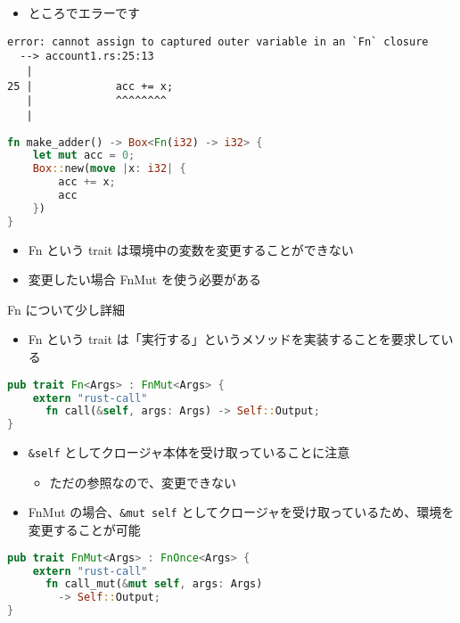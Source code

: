 \documentclass[dvipdfmx,11pt]{beamer}
\begin{document}
\begin{frame}[fragile]
  \begin{itemize}
  \item ところでエラーです
  \end{itemize}

  \begin{Verbatim}[fontsize=\scriptsize]
error: cannot assign to captured outer variable in an `Fn` closure
  --> account1.rs:25:13
   |
25 |             acc += x;
   |             ^^^^^^^^
   |
  \end{Verbatim}

\end{frame}

\begin{frame}[fragile]
    \begin{lstlisting}[language={Rust}]
fn make_adder() -> Box<Fn(i32) -> i32> {
    let mut acc = 0;
    Box::new(move |x: i32| {
        acc += x;
        acc
    })
}
    \end{lstlisting}

  \begin{itemize}
  \item Fn という trait は環境中の変数を変更することができない
  \item 変更したい場合 FnMut を使う必要がある
  \end{itemize}
\end{frame}

\begin{frame}[fragile]{Fn について少し詳細}
  \begin{itemize}
  \item Fn という trait は「実行する」というメソッドを実装することを要求している
  \end{itemize}

  \begin{lstlisting}[language={Rust}]
pub trait Fn<Args> : FnMut<Args> {
    extern "rust-call"
      fn call(&self, args: Args) -> Self::Output;
}
  \end{lstlisting}

  \begin{itemize}
  \item \verb+&self+ としてクロージャ本体を受け取っていることに注意
    \begin{itemize}
    \item ただの参照なので、変更できない
    \end{itemize}
  \item FnMut の場合、\verb+&mut self+ としてクロージャを受け取っているため、環境を変更することが可能
  \end{itemize}

  \begin{lstlisting}[language={Rust}]
pub trait FnMut<Args> : FnOnce<Args> {
    extern "rust-call"
      fn call_mut(&mut self, args: Args)
        -> Self::Output;
}
  \end{lstlisting}

\end{frame}
\end{document}
